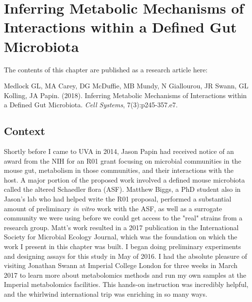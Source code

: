 \documentclass[11pt,twocolumn,notitlepage,openany,twoside]{book}
\begin{document}
\chapter{Inferring Metabolic Mechanisms of Interactions within a Defined Gut Microbiota}

\begin{refsection}

The contents of this chapter are published as a research article here:

\medskip\noindent
Medlock GL, MA Carey, DG McDuffie, MB Mundy, N Giallourou, JR Swann, GL Kolling, JA Papin. (2018). Inferring Metabolic Mechanisms of Interactions within a Defined Gut Microbiota. \textit{Cell Systems}, 7(3):p245-357.e7.

\section{Context}

Shortly before I came to UVA in 2014, Jason Papin had received notice of an award from the NIH for an R01 grant focusing on microbial communities in the mouse gut, metabolism in those communities, and their interactions with the host. A major portion of the proposed work involved a defined mouse microbiota called the altered Schaedler flora (ASF). Matthew Biggs, a PhD student also in Jason's lab who had helped write the R01 proposal, performed a substantial amount of preliminary \textit{in vitro} work with the ASF, as well as a surrogate community we were using before we could get access to the "real" strains from a research group. Matt's work resulted in a 2017 publication in the International Society for Microbial Ecology Journal, which was the foundation on which the work I present in this chapter was built. I began doing preliminary experiments and designing assays for this study in May of 2016. I had the absolute pleasure of visiting Jonathan Swann at Imperial College London for three weeks in March 2017 to learn more about metabolomics methods and run my own samples at the Imperial metabolomics facilities. This hands-on instruction was incredibly helpful, and the whirlwind international trip was enriching in so many ways.


\end{refsection}
\end{document}
